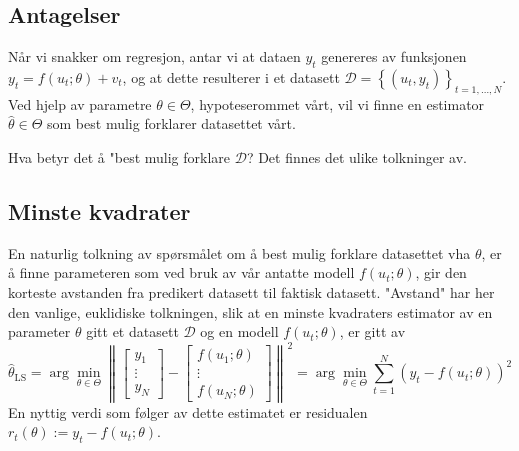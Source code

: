 \documentclass[12pt]{article}
\begin{document}
\subsection{Antagelser}
Når vi snakker om regresjon, antar vi at dataen $y_t$ genereres av funksjonen \(y_{t}=f\left(u_{t} ; \theta\right)+v_{t}\), og at dette resulterer i et datasett \(\mathcal{D}=\left\{\left(u_{t}, y_{t}\right)\right\}_{t=1, \ldots, N}\). Ved hjelp av parametre \(\theta \in \Theta\), hypoteserommet vårt, vil vi finne en estimator \(\widehat{\theta} \in \Theta\) som best mulig forklarer datasettet vårt.

Hva betyr det å "best mulig forklare $\mathcal{D}$? Det finnes det ulike tolkninger av.

\subsection{Minste kvadrater}
En naturlig tolkning av spørsmålet om å best mulig forklare datasettet vha $\theta$, er å finne parameteren som ved bruk av vår antatte modell $f(u_t; \theta)$, gir den korteste avstanden fra predikert datasett til faktisk datasett. "Avstand" har her den vanlige, euklidiske tolkningen, slik at en minste kvadraters estimator av en parameter $\theta$ gitt et datasett $\mathcal{D}$ og en modell $f(u_t; \theta)$, er gitt av
\begin{equation}
\widehat{\theta}_{\mathrm{LS}}=\arg \min _{\theta \in \Theta}\left\|\left[\begin{array}{c}
{y_{1}} \\
{\vdots} \\
{y_{N}}
\end{array}\right]-\left[\begin{array}{c}
{f\left(u_{1} ; \theta\right)} \\
{\vdots} \\
{f\left(u_{N} ; \theta\right)}
\end{array}\right]\right\|^{2}=\arg \min _{\theta \in \Theta} \sum_{t=1}^{N}\left(y_{t}-f\left(u_{t} ; \theta\right)\right)^{2}
\end{equation}
En nyttig verdi som følger av dette estimatet er residualen $r_{t}(\theta):=y_{t}-f\left(u_{t} ; \theta\right)$.
\end{document}
